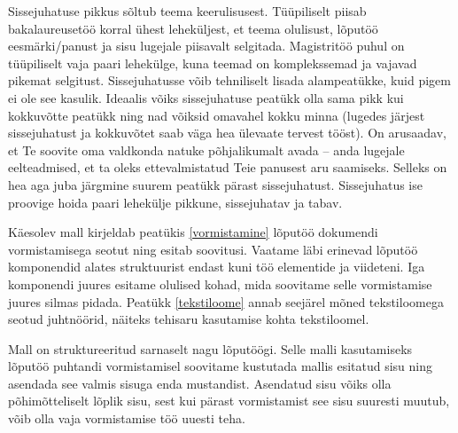Sissejuhatuse pikkus sõltub teema keerulisusest. Tüüpiliselt piisab bakalaureusetöö korral ühest leheküljest, et teema olulisust, lõputöö eesmärki/panust ja sisu lugejale piisavalt selgitada. Magistritöö puhul on tüüpiliselt vaja paari lehekülge, kuna teemad on komplekssemad ja vajavad pikemat selgitust. Sissejuhatusse võib tehniliselt lisada alampeatükke, kuid pigem ei ole see kasulik. Ideaalis võiks sissejuhatuse peatükk olla sama pikk kui kokkuvõtte peatükk ning nad võiksid omavahel kokku minna (lugedes järjest sissejuhatust ja kokkuvõtet saab väga hea ülevaate tervest tööst). On arusaadav, et Te soovite oma valdkonda natuke põhjalikumalt avada – anda lugejale eelteadmised, et ta oleks ettevalmistatud Teie panusest aru saamiseks. Selleks on hea aga juba järgmine suurem peatükk pärast sissejuhatust. Sissejuhatus ise proovige hoida paari lehekülje pikkune, sissejuhatav ja tabav.

Käesolev mall kirjeldab peatükis \ref{vormistamine} lõputöö dokumendi vormistamisega seotut ning esitab soovitusi. Vaatame läbi erinevad lõputöö komponendid alates struktuurist endast kuni töö elementide ja viideteni. Iga komponendi juures esitame olulised kohad, mida soovitame selle vormistamise juures silmas pidada. Peatükk \ref{tekstiloome} annab seejärel mõned tekstiloomega seotud juhtnöörid, näiteks tehisaru kasutamise kohta tekstiloomel.

Mall on struktureeritud sarnaselt nagu lõputöögi. Selle malli kasutamiseks lõputöö puhtandi vormistamisel soovitame kustutada mallis esitatud sisu ning asendada see valmis sisuga enda mustandist. Asendatud sisu võiks olla põhimõtteliselt lõplik sisu, sest kui pärast vormistamist see sisu suuresti muutub, võib olla vaja vormistamise töö uuesti teha.
